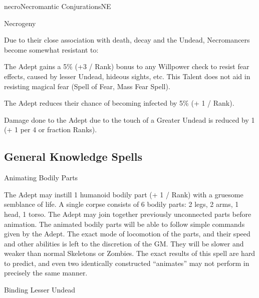 \begin{college}[1.1]{necro}{Necromantic Conjurations}{NE}
\begin{talent}[T-3]{Necrogeny}

\begin{effects}
Due to their close association with death, decay and the Undead,
Necromancers become somewhat resistant to:
\begin{Description}
\item[Fear Effects]
The Adept gains a 5\% (+3 / Rank) bonus to any Willpower check to resist
fear effects, caused by lesser Undead, hideous sights, etc.  This
Talent does not aid in resisting magical fear (\eg Spell of Fear,
Mass Fear Spell).
\item[Infection]
The Adept reduces their chance of becoming infected by 5\% (+ 1 / Rank).
\item[Undead Draining]
Damage done to the Adept due to the touch of a Greater Undead is
reduced by 1 (+ 1 per 4 or fraction Ranks).
\end{Description}
\end{effects}
\end{talent}

\subsection{General Knowledge Spells}

\begin{spell}[G-1]{Animating Bodily Parts}

\begin{effects}
The Adept may instill 1 humanoid bodily part (+ 1 / Rank) with a
gruesome semblance of life.  A single corpse consists of 6 bodily
parts: 2 legs, 2 arms, 1 head, 1 torso.  The Adept may join together
previously unconnected parts before animation.  The animated bodily
parts will be able to follow simple commands given by the Adept.  The
exact mode of locomotion of the parts, and their speed and other
abilities is left to the discretion of the GM.  They will be slower
and weaker than normal Skeletons or Zombies.  The exact results of
this spell are hard to predict, and even two identically constructed
``animates'' may not perform in precisely the same manner.
\end{effects}
\end{spell}

\begin{spell}[G-2]{Binding Lesser Undead}


\end{spell}
\end{college}
